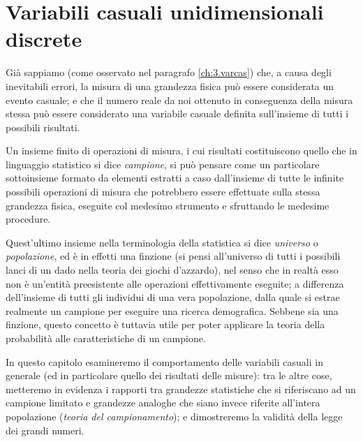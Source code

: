 
\chapter{Variabili casuali unidimensionali discrete}%
\label{ch:5.varcun}
Gi\`a sappiamo (come osservato nel paragrafo
\ref{ch:3.varcas}) che, a causa degli inevitabili errori, la
misura di una grandezza fisica pu\`o essere considerata un
evento casuale; e che il numero reale da noi ottenuto in
conseguenza della misura stessa pu\`o essere considerato una
variabile casuale definita sull'insieme di tutti i possibili
risultati.

Un insieme finito di operazioni di misura, i cui risultati
costituiscono quello che in linguaggio statistico si dice
\emph{campione},%
si pu\`o pensare come un particolare sottoinsieme formato da
elementi estratti a caso dall'insieme di tutte le infinite
possibili operazioni di misura che potrebbero essere
effettuate sulla stessa grandezza fisica, eseguite col
medesimo strumento e sfruttando le medesime procedure.

Quest'ultimo insieme nella terminologia della statistica si
dice \emph{universo} o \emph{popolazione},%
ed \`e in effetti una finzione (si pensi all'universo di
tutti i possibili lanci di un dado nella teoria dei giochi
d'azzardo), nel senso che in realt\`a esso non \`e
un'entit\`a preesistente alle operazioni effettivamente
eseguite; a differenza dell'insieme di tutti gli individui
di una vera popolazione, dalla quale si estrae realmente un
campione per eseguire una ricerca demografica.  Sebbene sia
una finzione, questo concetto \`e tuttavia utile per poter
applicare la teoria della probabilit\`a alle caratteristiche
di un campione.

In questo capitolo esamineremo il comportamento delle
variabili casuali in generale (ed in particolare quello dei
risultati delle misure): tra le altre cose, metteremo in
evidenza i rapporti tra grandezze statistiche che si
riferiscano ad un campione limitato e grandezze analoghe che
siano invece riferite all'intera popolazione (\emph{teoria
  del campionamento}); e dimostreremo la validit\`a della
legge dei grandi numeri.

